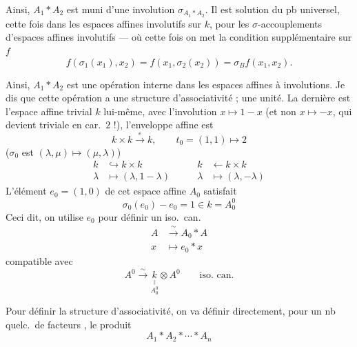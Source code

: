 \documentclass[11pt,a4paper]{article}
\begin{document}

Ainsi, $A_1 * A_2$ est muni d'une involution $\sigma_{A_1 * A_2}$. Il est solution du pb universel, cette fois dans les espaces affines involutifs sur $k$, pour les $\sigma$-accouplements d'espaces affines involutifs --- où cette fois on met la condition supplémentaire sur $f$
\[
  f(\sigma_1(x_1), x_2) = f(x_1, \sigma_2(x_2)) = \sigma_B f(x_1, x_2) .
\]

Ainsi, $A_1 * A_2$ est une opération interne dans les espaces affines à involutions. Je dis que cette opération a une structure d'associativité ; une  unité. La dernière est l'espace affine trivial $k$ lui-même, avec l'involution $x \mapsto 1 - x$ (et non $x \mapsto -x$, qui \struck{\ill{}} devient triviale en car.\ $2$ !), l'enveloppe affine est 
\[
  k \times k \xrightarrow{\ \varepsilon\ } k , \qquad t_0 = (1,1) \mapsto 2
\]
($\sigma_0$ est $(\lambda, \mu) \mapsto (\mu, \lambda)$)
\[
  \begin{aligned}
    k &\hookrightarrow k \times k \\
    \lambda &\longmapsto (\lambda, 1 - \lambda)
  \end{aligned}
  \qquad
  \begin{aligned}
    k &\longleftarrow k \times k \\
    \lambda &\longmapsto (\lambda, -\lambda)
  \end{aligned}
\]
L'élément $e_0 = (1, 0)$ de cet espace affine $A_0$  satisfait
\[
  \sigma_0(e_0) - e_0 = 1 \in k = A_0^0
\]
Ceci dit, on utilise $e_0$ pour définir un iso.\ can.
\[
  \begin{aligned}
    A &\xrightarrow{\ \sim\ } A_0 * A \\
    x &\longmapsto e_0 * x
  \end{aligned}
\]
compatible avec
\[
  A^0 \xrightarrow{\ \sim\ } \underset{\overset{\|}{A_0^0}}{k} \otimes A^0 \qquad \text{iso.\ can.}
\]

Pour définir la structure d'associativité, on va définir directement, pour un nb quelc.\ de facteurs , le produit
\[
  A_1 * A_2 * \cdots * A_n
\]
\end{document}
